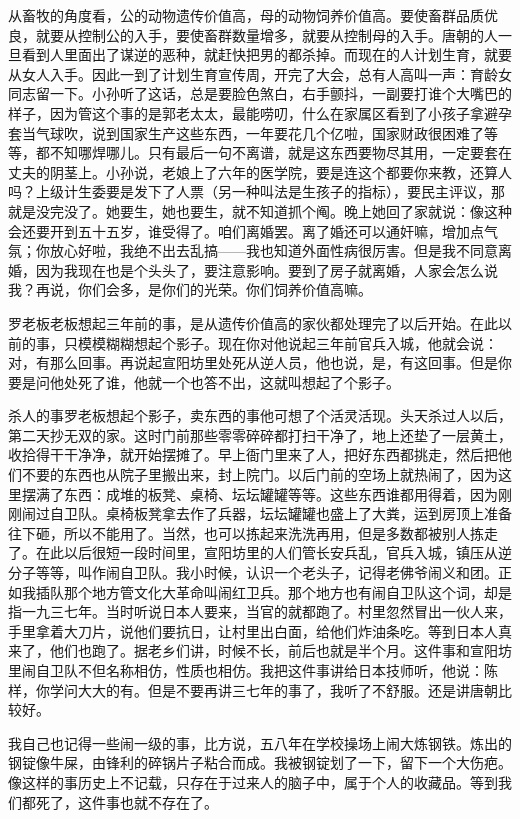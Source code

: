 从畜牧的角度看，公的动物遗传价值高，母的动物饲养价值高。要使畜群品质优良，就要从控制公的入手，要使畜群数量增多，就要从控制母的入手。唐朝的人一旦看到人里面出了谋逆的恶种，就赶快把男的都杀掉。而现在的人计划生育，就要从女人入手。因此一到了计划生育宣传周，开完了大会，总有人高叫一声：育龄女同志留一下。小孙听了这话，总是要脸色煞白，右手颤抖，一副要打谁个大嘴巴的样子，因为管这个事的是郭老太太，最能唠叨，什么在家属区看到了小孩子拿避孕套当气球吹，说到国家生产这些东西，一年要花几个亿啦，国家财政很困难了等等，都不知哪焊哪儿。只有最后一句不离谱，就是这东西要物尽其用，一定要套在丈夫的阴茎上。小孙说，老娘上了六年的医学院，要是连这个都要你来教，还算人吗？上级计生委要是发下了人票（另一种叫法是生孩子的指标），要民主评议，那就是没完没了。她要生，她也要生，就不知道抓个阄。晚上她回了家就说：像这种会还要开到五十五岁，谁受得了。咱们离婚罢。离了婚还可以通奸嘛，增加点气氛；你放心好啦，我绝不出去乱搞——我也知道外面性病很厉害。但是我不同意离婚，因为我现在也是个头头了，要注意影响。要到了房子就离婚，人家会怎么说我？再说，你们会多，是你们的光荣。你们饲养价值高嘛。 

罗老板老板想起三年前的事，是从遗传价值高的家伙都处理完了以后开始。在此以前的事，只模模糊糊想起个影子。现在你对他说起三年前官兵入城，他就会说：对，有那么回事。再说起宣阳坊里处死从逆人员，他也说，是，有这回事。但是你要是问他处死了谁，他就一个也答不出，这就叫想起了个影子。 

杀人的事罗老板想起个影子，卖东西的事他可想了个活灵活现。头天杀过人以后，第二天抄无双的家。这时门前那些零零碎碎都打扫干净了，地上还垫了一层黄土，收拾得干干净净，就开始摆摊了。早上衙门里来了人，把好东西都挑走，然后把他们不要的东西也从院子里搬出来，封上院门。以后门前的空场上就热闹了，因为这里摆满了东西：成堆的板凳、桌椅、坛坛罐罐等等。这些东西谁都用得着，因为刚刚闹过自卫队。桌椅板凳拿去作了兵器，坛坛罐罐也盛上了大粪，运到房顶上准备往下砸，所以不能用了。当然，也可以拣起来洗洗再用，但是多数都被别人拣走了。在此以后很短一段时间里，宣阳坊里的人们管长安兵乱，官兵入城，镇压从逆分子等等，叫作闹自卫队。我小时候，认识一个老头子，记得老佛爷闹义和团。正如我插队那个地方管文化大革命叫闹红卫兵。那个地方也有闹自卫队这个词，却是指一九三七年。当时听说日本人要来，当官的就都跑了。村里忽然冒出一伙人来，手里拿着大刀片，说他们要抗日，让村里出白面，给他们炸油条吃。等到日本人真来了，他们也跑了。据老乡们讲，时候不长，前后也就是半个月。这件事和宣阳坊里闹自卫队不但名称相仿，性质也相仿。我把这件事讲给日本技师听，他说：陈样，你学问大大的有。但是不要再讲三七年的事了，我听了不舒服。还是讲唐朝比较好。 

我自己也记得一些闹一级的事，比方说，五八年在学校操场上闹大炼钢铁。炼出的钢锭像牛屎，由锋利的碎锅片子粘合而成。我被钢锭划了一下，留下一个大伤疤。像这样的事历史上不记载，只存在于过来人的脑子中，属于个人的收藏品。等到我们都死了，这件事也就不存在了。 

